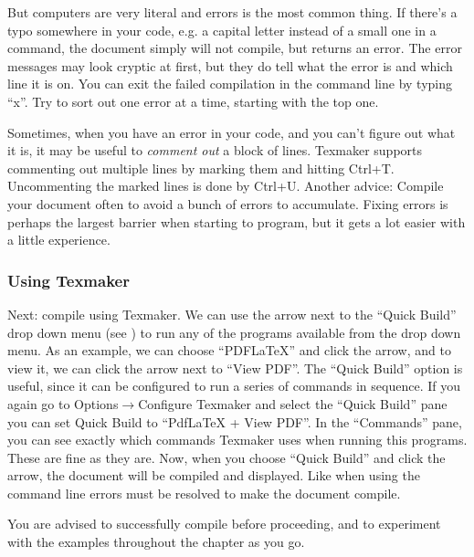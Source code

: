 But computers are very literal and errors is the most common thing. If there's a typo somewhere in your code, e.g. a capital letter instead of a small one in a command, the document simply will not compile, but returns an error. The error messages may look cryptic at first, but they do tell what the error is and which line it is on. You can exit the failed compilation in the command line by typing ``x''. Try to sort out one error at a time, starting with the top one.

Sometimes, when you have an error in your code, and you can't figure out what it is, it may be useful to \emph{comment out} a block of lines. Texmaker supports commenting out multiple lines by marking them and hitting Ctrl+T. Uncommenting the marked lines is done by Ctrl+U. Another advice: Compile your document often to avoid a bunch of errors to accumulate. Fixing errors is perhaps the largest barrier when starting to program, but it gets a lot easier with a little experience.

\subsubsection{Using Texmaker}
Next: compile using Texmaker. We can use the arrow next to the ``Quick Build'' drop down menu (see ) to run any of the programs available from the drop down menu. As an example, we can choose ``PDFLaTeX'' and click the arrow, and to view it, we can click the arrow next to ``View PDF''. The ``Quick Build'' option is useful, since it can be configured to run a series of commands in sequence. If you again go to Options$\rightarrow$Configure Texmaker and select the ``Quick Build'' pane you can set Quick Build to ``PdfLaTeX + View PDF''. In the ``Commands'' pane, you can see exactly which commands Texmaker uses when running this programs. These are fine as they are. Now, when you choose ``Quick Build'' and click the arrow, the document will be compiled and displayed. Like when using the command line errors must be resolved to make the document compile.

You are advised to successfully compile  before proceeding, and to experiment with the examples throughout the chapter as you go.

